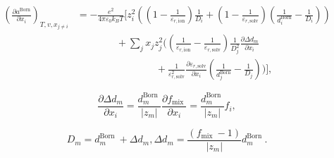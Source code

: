 \documentclass[12pt, letterpaper]{article}
\begin{document}
\begin{equation}
    \begin{aligned}
        \left(\frac{\partial a^{\mathrm{Born}}}{\partial x_{i}}\right)_{T,v,x_{j\neq i}}
         & =
        -\frac{e^2}{4\pi\varepsilon_{0} k_{B} T}
        \Bigg[
            z_{i}^2\!\left(
            \left(1-\frac{1}{\varepsilon_{r,\mathrm{ion}}}\right)\frac{1}{D_{i}}
            +
            \left(1-\frac{1}{\varepsilon_{r,\mathrm{solv}}}\right)\left(\frac{1}{d_{i}^{\mathrm{Born}}}-\frac{1}{D_{i}}\right)
            \right)
        \\
         & \qquad\qquad
            +\sum_{j} x_{j} z_{j}^2
            \Bigg(
            \left(\frac{1}{\varepsilon_{r,\mathrm{ion}}}-\frac{1}{\varepsilon_{r,\mathrm{solv}}}\right)
            \frac{1}{D_{j}^2}
            \frac{\partial \Delta d_{m}}{\partial x_{i}}
            \\
         & \qquad\qquad\qquad\qquad
            +
            \frac{1}{\varepsilon_{r,\mathrm{solv}}^2}
            \frac{\partial \varepsilon_{r,\mathrm{solv}}}{\partial x_{i}}
            \left(\frac{1}{d_{j}^{\mathrm{Born}}}-\frac{1}{D_{j}}\right)
            \Bigg)
            \Bigg],
    \end{aligned}
    \label{eq:dares_born_dxi_v4}
\end{equation}


\begin{equation}
    \frac{\partial \Delta d_{m}}{\partial x_{i}}=\frac{d_{m}^{\text {Born }}}{\left|z_{m}\right|} \frac{\partial f_{\text {mix }}}{\partial x_{i}}=\frac{d_{m}^{\text {Born }}}{\left|z_{m}\right|} f_{i},
    \label{eq:ddelta_d_dxi}
\end{equation}


\begin{equation}
    D_{m}=d_{m}^{\text {Born }}+\Delta d_{m}, \Delta d_{m}=\frac{\left(f_{\text {mix }}-1\right)}{\left|z_{m}\right|} d_{m}^{\text {Born }} .
    \label{eq:d_born_effective}
\end{equation}
\end{document}
